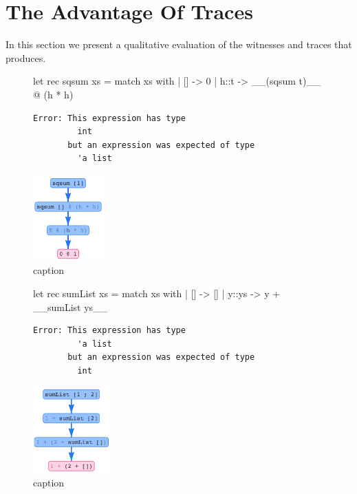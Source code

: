 \section{The Advantage Of Traces}
\label{sec:advantage-traces}
In this section we present a qualitative evaluation of the witnesses and
traces that \toolname produces.

\begin{figure}[ht]
\centering
\begin{minipage}{0.49\linewidth}
\centering
\begin{ecode}
let rec sqsum xs = match xs with
  | [] -> 0
  | h::t -> __(sqsum t)__ @ (h * h)
\end{ecode}
\begin{verbatim}
Error: This expression has type
         int
       but an expression was expected of type
         'a list
\end{verbatim}
\end{minipage}
\begin{minipage}{0.49\linewidth}
\centering
\includegraphics[height=125px]{sqsum.png}
\end{minipage}
\caption{caption}
\label{fig:traces}
\end{figure}

\begin{figure}[ht]
\centering
\begin{minipage}{0.49\linewidth}
\centering
\begin{ecode}
let rec sumList xs = match xs with
  | []    -> []
  | y::ys -> y + __sumList ys__
\end{ecode}
\begin{verbatim}
Error: This expression has type
         'a list
       but an expression was expected of type
         int
\end{verbatim}
\end{minipage}
\begin{minipage}{0.49\linewidth}
\centering
\includegraphics[height=125px]{sumlist.png}
\end{minipage}
\caption{caption}
\label{fig:traces}
\end{figure}

